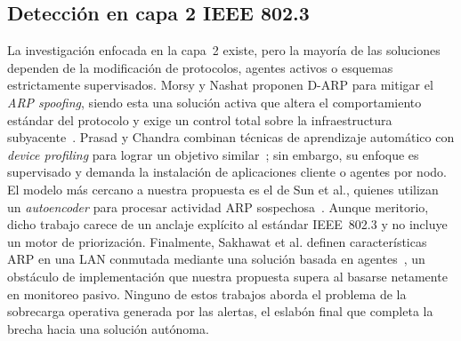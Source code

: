 \documentclass[conference]{IEEEtran}
\begin{document}
\subsection{Detección en capa 2 IEEE 802.3}
La investigación enfocada en la capa~2 existe, pero la mayoría de las
soluciones dependen de la modificación de protocolos, agentes activos o
esquemas estrictamente supervisados. Morsy y Nashat proponen D-ARP para
mitigar el \textit{ARP spoofing}, siendo esta una solución activa que
altera el comportamiento estándar del protocolo y exige un control total
sobre la infraestructura subyacente~\cite{morsy2022}. Prasad y Chandra
combinan técnicas de aprendizaje automático con \textit{device profiling}
para lograr un objetivo similar~\cite{prasad2022}; sin embargo, su
enfoque es supervisado y demanda la instalación de aplicaciones cliente
o agentes por nodo. El modelo más cercano a nuestra propuesta es el de
Sun et al., quienes utilizan un \textit{autoencoder} para procesar
actividad ARP sospechosa~\cite{sun2022ccnc}. Aunque meritorio, dicho
trabajo carece de un anclaje explícito al estándar IEEE~802.3 y no
incluye un motor de priorización. Finalmente, Sakhawat et al. definen
características ARP en una LAN conmutada mediante una solución basada en
agentes~\cite{sakhawat2019}, un obstáculo de implementación que nuestra
propuesta supera al basarse netamente en monitoreo pasivo. Ninguno de
estos trabajos aborda el problema de la sobrecarga operativa generada por
las alertas, el eslabón final que completa la brecha hacia una solución
autónoma.
 
\end{document}
